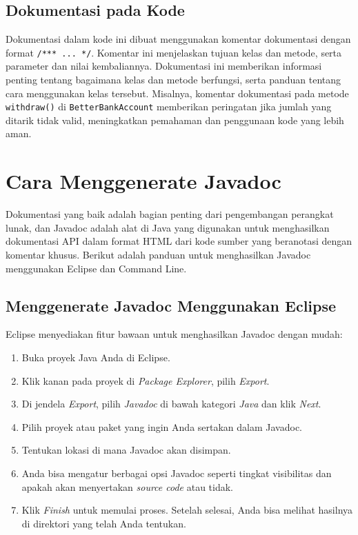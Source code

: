 \subsection{Dokumentasi pada Kode}

Dokumentasi dalam kode ini dibuat menggunakan komentar dokumentasi dengan format \texttt{/*** ... */}. Komentar ini menjelaskan tujuan kelas dan metode, serta parameter dan nilai kembaliannya. Dokumentasi ini memberikan informasi penting tentang bagaimana kelas dan metode berfungsi, serta panduan tentang cara menggunakan kelas tersebut. Misalnya, komentar dokumentasi pada metode \texttt{withdraw()} di \texttt{BetterBankAccount} memberikan peringatan jika jumlah yang ditarik tidak valid, meningkatkan pemahaman dan penggunaan kode yang lebih aman.

\section{Cara Menggenerate Javadoc}

Dokumentasi yang baik adalah bagian penting dari pengembangan perangkat lunak, dan Javadoc adalah alat di Java yang digunakan untuk menghasilkan dokumentasi API dalam format HTML dari kode sumber yang beranotasi dengan komentar khusus. Berikut adalah panduan untuk menghasilkan Javadoc menggunakan Eclipse dan Command Line.

\subsection{Menggenerate Javadoc Menggunakan Eclipse}

Eclipse menyediakan fitur bawaan untuk menghasilkan Javadoc dengan mudah:

\begin{enumerate} \item Buka proyek Java Anda di Eclipse. \item Klik kanan pada proyek di \textit{Package Explorer}, pilih \textit{Export}. \item Di jendela \textit{Export}, pilih \textit{Javadoc} di bawah kategori \textit{Java} dan klik \textit{Next}. \item Pilih proyek atau paket yang ingin Anda sertakan dalam Javadoc. \item Tentukan lokasi di mana Javadoc akan disimpan. \item Anda bisa mengatur berbagai opsi Javadoc seperti tingkat visibilitas dan apakah akan menyertakan \textit{source code} atau tidak. \item Klik \textit{Finish} untuk memulai proses. Setelah selesai, Anda bisa melihat hasilnya di direktori yang telah Anda tentukan. \end{enumerate}

